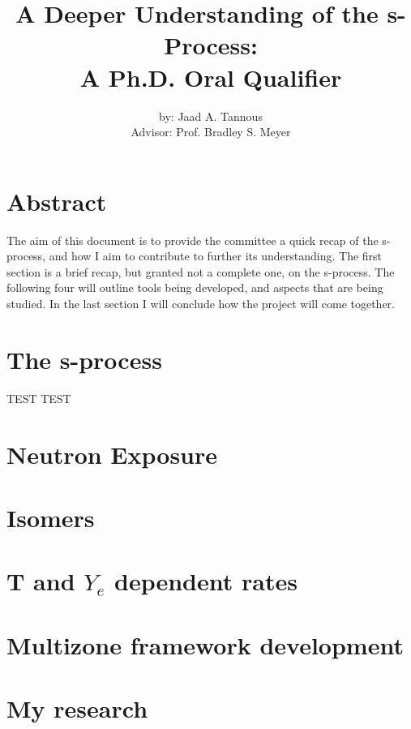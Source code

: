 \documentclass{article}
\title{A Deeper Understanding of the s-Process:\\
A Ph.D. Oral Qualifier}
\author{by: Jaad A. Tannous\\
Advisor: Prof. Bradley S. Meyer}
\date{}
\begin{document}
\maketitle

\section*{Abstract}
The aim of this document is to provide the committee a quick recap of the s-process, and how I aim to 
contribute to further its understanding. The first section is a brief recap, but granted not a complete 
one, on the s-process. The following four will outline tools being developed, and aspects that are being 
studied. In the last section I will conclude how the project will come together.
\section*{The s-process}
TEST TEST
\section*{Neutron Exposure}
\section*{Isomers}
\section*{T and $Y_{e}$ dependent rates}
\section*{Multizone framework development}
\section*{My research}
\end{document}
